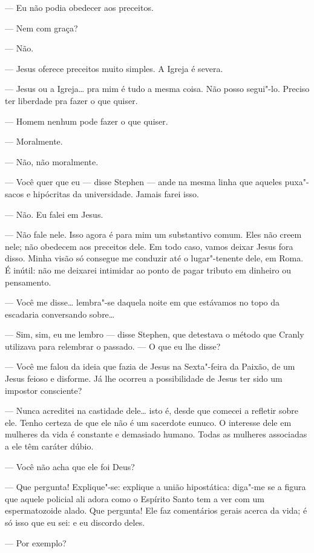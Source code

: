 --- Eu não podia obedecer aos preceitos.

--- Nem com graça?

--- Não.

--- Jesus oferece preceitos muito simples.  A Igreja é severa.

--- Jesus ou a Igreja\ldots{} pra mim é tudo a mesma coisa.  Não posso segui"-lo.
Preciso ter liberdade pra fazer o que quiser.

--- Homem nenhum pode fazer o que quiser.

--- Moralmente.

--- Não, não moralmente.

--- Você quer que eu --- disse Stephen --- ande na mesma linha que aqueles
puxa"-sacos e hipócritas da universidade.  Jamais farei isso.

--- Não.  Eu falei em Jesus.

--- Não fale nele.  Isso agora é para mim um substantivo comum.  Eles não creem
nele; não obedecem aos preceitos dele.  Em todo caso, vamos deixar Jesus fora
disso.  Minha visão só consegue me conduzir até o lugar"-tenente dele, em Roma.
É inútil: não me deixarei intimidar ao ponto de pagar tributo em dinheiro ou
pensamento.

--- Você me disse\ldots{} lembra"-se daquela noite em que estávamos no topo da
escadaria conversando sobre\ldots{}

--- Sim, sim, eu me lembro --- disse Stephen, que detestava o \label{metodo"-que} método que
Cranly utilizava para relembrar o passado.  --- O que eu lhe disse?

--- Você me falou da ideia que fazia de Jesus na Sexta"-feira da Paixão, de um
Jesus feioso e disforme.  Já lhe ocorreu a possibilidade de Jesus ter sido um
impostor consciente?

--- Nunca acreditei na castidade dele\ldots{} isto é, desde que comecei a refletir
sobre ele.  Tenho certeza de que ele não é um sacerdote eunuco.  O interesse
dele em mulheres da vida é constante e demasiado humano.  Todas as mulheres
associadas a ele têm caráter dúbio.

--- Você não acha que ele foi Deus?

--- Que pergunta!  Explique"-se: explique a união hipostática: diga"-me se a
figura que \label{aquele"-policial} aquele policial ali adora como o Espírito Santo tem a ver com um
espermatozoide alado.  Que pergunta!  Ele faz comentários gerais acerca da
vida; é só isso que eu sei: e eu discordo deles.

--- Por exemplo?

